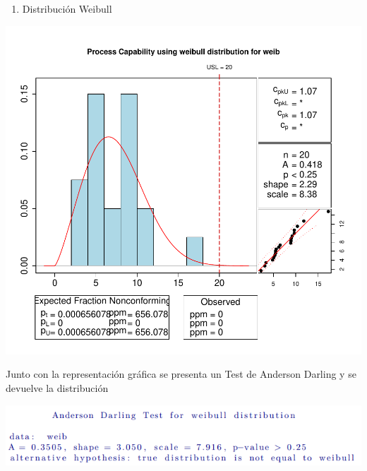 \documentclass[
]{book}
\newenvironment{Shaded}{\begin{snugshade}}{\end{snugshade}}
\newcommand{\AttributeTok}[1]{\textcolor[rgb]{0.13,0.29,0.53}{#1}}
\newcommand{\DecValTok}[1]{\textcolor[rgb]{0.00,0.00,0.81}{#1}}
\newcommand{\DocumentationTok}[1]{\textcolor[rgb]{0.56,0.35,0.01}{\textbf{\textit{#1}}}}
\newcommand{\FunctionTok}[1]{\textcolor[rgb]{0.13,0.29,0.53}{\textbf{#1}}}
\newcommand{\NormalTok}[1]{#1}
\newcommand{\OtherTok}[1]{\textcolor[rgb]{0.56,0.35,0.01}{#1}}
\newcommand{\StringTok}[1]{\textcolor[rgb]{0.31,0.60,0.02}{#1}}
\providecommand{\tightlist}{%
  \setlength{\itemsep}{0pt}\setlength{\parskip}{0pt}}
\begin{document}
\begin{enumerate}
\def\labelenumi{\arabic{enumi}.}
\setcounter{enumi}{1}
\tightlist
\item
  Distribución Weibull
\end{enumerate}

\begin{Shaded}
\end{Shaded}

\begin{center}\includegraphics{Libro_TidyQualityTools_files/figure-latex/unnamed-chunk-86-1} \end{center}

Junto con la representación gráfica se presenta un Test de Anderson Darling y se devuelve la distribución

\includegraphics{graficos/AndersonDarling.png}
\end{document}
